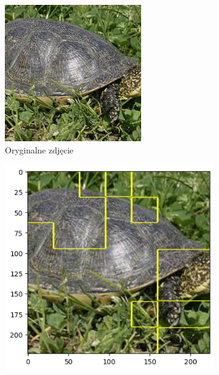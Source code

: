 \begin{figure}[h]
	\centering
	\begin{subfigure}[b]{0.3\textwidth}
		\includegraphics[width=.9\textwidth]{img/examples/appendix/n01667778_32805}
		\caption{Oryginalne zdjęcie}  \label{}
	\end{subfigure}
	\begin{subfigure}[b]{0.3\textwidth}
		\centering\includegraphics[width=.9\textwidth]{img/examples/appendix/n01667778_32805_gradcam}

\end{subfigure}
\end{figure}

